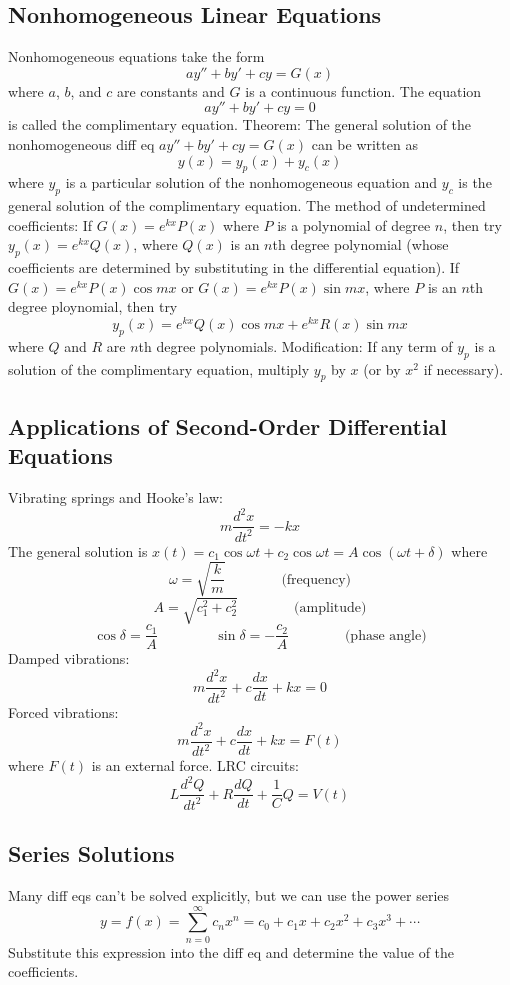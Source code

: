 \documentclass{article}
\begin{document}
    \subsection{Nonhomogeneous Linear Equations}
    \begin{outline}
        \1 Nonhomogeneous equations take the form \[ay''+by'+cy=G(x)\] where $a$, $b$, and $c$ are constants and $G$ is a continuous function. The equation \[ay''+by'+cy=0\] is called the complimentary equation. 
        \1 Theorem: The general solution of the nonhomogeneous diff eq \(ay''+by'+cy=G(x)\) can be written as \[y(x)=y_p(x)+y_c(x)\] where $y_p$ is a particular solution of the nonhomogeneous equation and $y_c$ is the general solution of the complimentary equation. 
        \1 The method of undetermined coefficients: 
            \2 If \(G(x)=e^{kx}P(x)\) where $P$ is a polynomial of degree $n$, then try \(y_p(x)=e^{kx}Q(x)\), where \(Q(x)\) is an $n$th degree polynomial (whose coefficients are determined by substituting in the differential equation). 
            \2 If \(G(x)=e^{kx}P(x)\cos mx\) or \(G(x)=e^{kx}P(x)\sin mx\), where $P$ is an $n$th degree ploynomial, then try \[y_p(x)=e^{kx}Q(x)\cos mx+e^{kx}R(x)\sin mx\] where $Q$ and $R$ are $n$th degree polynomials. 
            \2 Modification: If any term of $y_p$ is a solution of the complimentary equation, multiply $y_p$ by $x$ (or by $x^2$ if necessary). 

    \end{outline}
    \subsection{Applications of Second-Order Differential Equations}
    \begin{outline}
        \1 Vibrating springs and Hooke's law: \[m\dfrac{d^2x}{dt^2}=-kx\] The general solution is \(x(t)=c_1\cos\omega t+c_2\cos\omega t=A\cos(\omega t+\delta)\) where \[\omega=\sqrt{\dfrac{k}{m}}\qquad\qquad\text{(frequency)}\]\[A=\sqrt{c_1^2+c_2^2}\qquad\qquad\text{(amplitude)}\]\[\cos\delta=\dfrac{c_1}{A}\qquad\qquad\sin\delta=-\dfrac{c_2}{A}\qquad\qquad\text{(phase angle)}\]
        \1 Damped vibrations: \[m\dfrac{d^2x}{dt^2}+c\dfrac{dx}{dt}+kx=0\]
        \1 Forced vibrations: \[m\dfrac{d^2x}{dt^2}+c\dfrac{dx}{dt}+kx=F(t)\] where \(F(t)\) is an external force. 
        \1 LRC circuits: \[L\dfrac{d^2Q}{dt^2}+R\dfrac{dQ}{dt}+\dfrac{1}{C}Q=V(t)\]
    \end{outline}
    \subsection{Series Solutions}
    \begin{outline}
        \1 Many diff eqs can't be solved explicitly, but we can use the power series \[y=f(x)=\sum^\infty_{n=0}c_nx^n=c_0+c_1x+c_2x^2+c_3x^3+\cdots\]
        \1 Substitute this expression into the diff eq and determine the value of the coefficients. 
    \end{outline}
\end{document}
